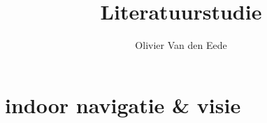\documentclass[11pt,a4paper]{article}
\title{Literatuurstudie}
\author{Olivier Van den Eede}
\date{}
\begin{document}
        \maketitle
        
        \section{indoor navigatie \& visie}
            
        
    
    
\end{document}
